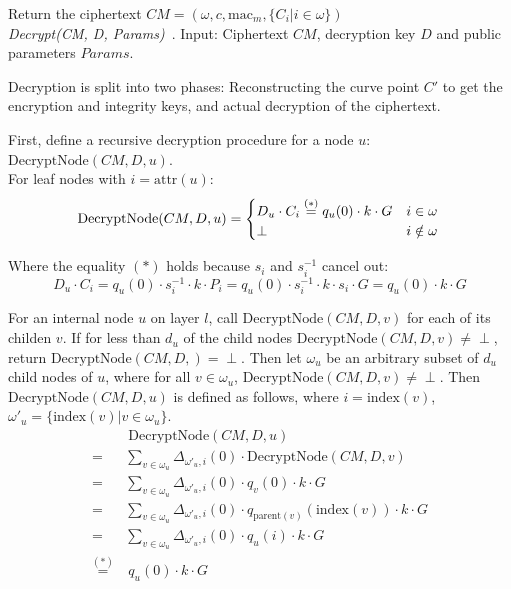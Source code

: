 Return the ciphertext $CM = (\omega, c, \text{mac}_m, \{C_i | i \in \omega\})$\\

\emph{Decrypt(CM, D, Params)}~\cite{yao_lightweight_2015}. Input: Ciphertext $CM$, decryption key $D$ and public parameters $Params$.

Decryption is split into two phases: Reconstructing the curve point $C'$ to get the encryption and integrity keys, and actual decryption of the ciphertext.

First, define a recursive decryption procedure for a node $u$: $\text{DecryptNode}(CM, D, u)$. \\
For leaf nodes with $i = \text{attr}(u)$:
\begin{equation*}
    \text{DecryptNode}(CM, D, u) = \begin{cases}
        D_u \cdot C_i \stackrel{(*)}{=} q_u(0) \cdot k \cdot G & i \in \omega\\
        \perp & i \notin \omega
    \end{cases}\\
\end{equation*}

Where the equality $(*)$ holds because $s_i$ and $s_i^{-1}$ cancel out: 
\begin{equation*}
    D_u \cdot C_i = q_u(0) \cdot s_i^{-1} \cdot k \cdot P_i = q_u(0) \cdot s_i^{-1} \cdot k \cdot s_i \cdot G = q_u(0) \cdot k \cdot G
\end{equation*}

For an internal node $u$ on layer $l$, call $\text{DecryptNode}(CM, D, v)$ for each of its childen $v$. If for less than $d_u$ of the child nodes $\text{DecryptNode}(CM, D, v) \neq \perp$, return $\text{DecryptNode}(CM, D, )=\perp$.
Then let $\omega_u$ be an arbitrary subset of $d_u$ child nodes of $u$, where for all $v \in \omega_u$, $\text{DecryptNode}(CM, D, v) \neq \perp$.
Then $\text{DecryptNode}(CM, D, u)$ is defined as follows, where $i = \text{index}(v)$, $\omega'_u = \{\text{index}(v) | v \in \omega_u\}$.
\begin{equation*}
    \begin{split}
        &~\text{DecryptNode}(CM, D, u)\\
        =& \sum_{v \in \omega_u} \Delta_{\omega'_u, i}(0) \cdot \text{DecryptNode}(CM, D, v)\\
        =& \sum_{v \in \omega_u} \Delta_{\omega'_u, i}(0) \cdot q_v(0) \cdot k \cdot G\\
        =& \sum_{v \in \omega_u} \Delta_{\omega'_u, i}(0) \cdot q_{\text{parent}(v)}(\text{index}(v)) \cdot k \cdot G\\
        =& \sum_{v \in \omega_u} \Delta_{\omega'_u, i}(0) \cdot q_u(i) \cdot k \cdot G\\
        \stackrel{(*)}{=}&~q_u(0) \cdot k \cdot G
    \end{split}
\end{equation*}

